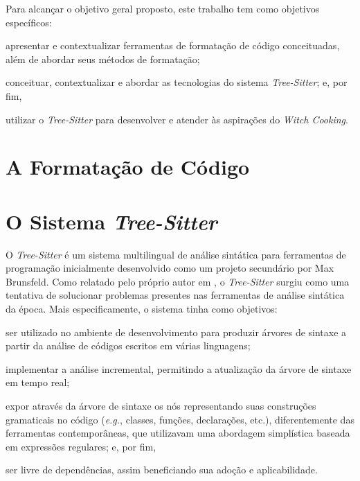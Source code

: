 \documentclass[11pt, openright, twoside, a4paper, english, brazil]{abntex2}
\begin{document}
Para alcançar o objetivo geral proposto, este trabalho tem como objetivos
específicos:
\begin{inparaenum}
	\item apresentar e contextualizar ferramentas de formatação de código
	      conceituadas, além de abordar seus métodos de formatação;
	\item conceituar, contextualizar e abordar as tecnologias do sistema
	      \textit{Tree-Sitter}; e, por fim,
	\item utilizar o \textit{Tree-Sitter} para desenvolver e atender às
	      aspirações do \textit{Witch Cooking}.
\end{inparaenum}

\chapter{A Formatação de Código}

\chapter{O Sistema \textit{Tree-Sitter}}

O \textit{Tree-Sitter} é um sistema multilingual de análise sintática para
ferramentas de programação inicialmente desenvolvido como um projeto secundário
por Max Brunsfeld. Como relatado pelo próprio autor em \cite{github-2017-tree},
o \textit{Tree-Sitter} surgiu como uma tentativa de solucionar problemas
presentes nas ferramentas de análise sintática da época. Mais especificamente,
o sistema tinha como objetivos:
\begin{inparaenum}
	\item ser utilizado no ambiente de desenvolvimento para produzir árvores de
	      sintaxe a partir da análise de códigos escritos em várias linguagens;
	\item implementar a análise incremental, permitindo a atualização da árvore
	      de sintaxe em tempo real;
	\item expor através da árvore de sintaxe os nós representando suas
	      construções gramaticais no código (\textit{e.g.}, classes, funções,
	      declarações, etc.), diferentemente das ferramentas contemporâneas, que
	      utilizavam uma abordagem simplística baseada em expressões regulares;
	      e, por fim,
	\item ser livre de dependências, assim beneficiando sua adoção e
	      aplicabilidade.
\end{inparaenum}
\end{document}
